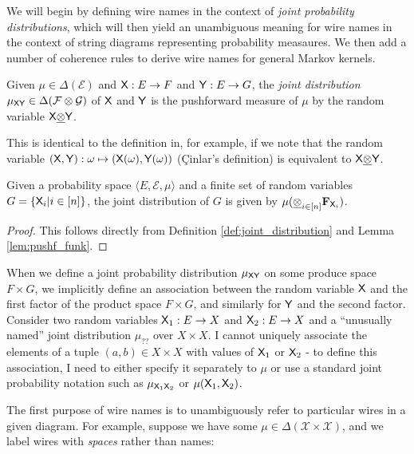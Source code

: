 We will begin by defining wire names in the context of \emph{joint probability distributions}, which will then yield an unambiguous meaning for wire names in the context of string diagrams representing probability measaures. We then add a number of coherence rules to derive wire names for general Markov kernels.

\begin{definition}\label{def:joint_distribution}
Given $\mu\in \Delta(\mathcal{E})$ and $\mathsf{X}:E\to F$ and $\mathsf{Y}:E\to G$, the \emph{joint distribution} $\mu_{\mathsf{X}\mathsf{Y}}\in \Delta(\mathcal{F}\otimes\mathcal{G})$ of $\mathsf{X}$ and $\mathsf{Y}$ is the pushforward measure of $\mu$ by the random variable $\mathsf{X}\underline{\otimes}\mathsf{Y}$.

This is identical to the definition in, for example, \citet{cinlar_probability_2011} if we note that the random variable $(\mathsf{X},\mathsf{Y}):\omega\mapsto (\mathsf{X}(\omega),\mathsf{Y}(\omega))$ (\c{C}inlar's definition) is equivalent to $\mathsf{X}\underline{\otimes}\mathsf{Y}$.
\end{definition}

\begin{lemma}\label{lem:rvg_jd}
Given a probability space $\langle E,\mathcal{E},\mu \rangle$ and a finite set of random variables $G = \{\mathsf{X}_i|i\in [n]\}$, the joint distribution of $G$ is given by $\mu (\underline{\otimes}_{i\in [n]} \mathbf{F}_{\mathsf{X}_i})$.
\end{lemma}

\begin{proof}
This follows directly from Definition \ref{def:joint_distribution} and Lemma \ref{lem:pushf_funk}.
\end{proof}

When we define a joint probability distribution $\mu_{\mathsf{X}\mathsf{Y}}$ on some produce space $F\times G$, we implicitly define an association between the random variable $\mathsf{X}$ and the first factor of the product space $F\times G$, and similarly for $\mathsf{Y}$ and the second factor. Consider two random variables $\mathsf{X}_1:E\to X$ and $\mathsf{X}_2:E\to X$ and a ``unusually named'' joint distribution $\mu_{??}$ over $X\times X$. I cannot uniquely associate the elements of a tuple $(a,b)\in X\times X$ with values of $\mathsf{X}_1$ or $\mathsf{X}_2$ - to define this association, I need to either specify it separately to $\mu$ or use a standard joint probability notation such as $\mu_{\mathsf{X}_1\mathsf{X}_2}$ or $\mu(\mathsf{X}_1,\mathsf{X}_2)$.

The first purpose of wire names is to unambiguously refer to particular wires in a given diagram. For example, suppose we have some $\mu\in \Delta(\mathcal{X}\times\mathcal{X})$, and we label wires with \emph{spaces} rather than names:

